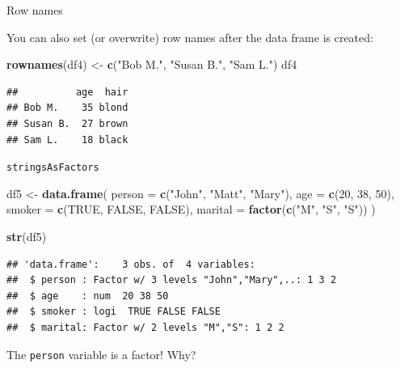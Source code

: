 \documentclass[ignorenonframetext,]{beamer}
\newenvironment{Shaded}{\begin{snugshade}}{\end{snugshade}}
\newcommand{\DataTypeTok}[1]{\textcolor[rgb]{0.13,0.29,0.53}{#1}}
\newcommand{\DecValTok}[1]{\textcolor[rgb]{0.00,0.00,0.81}{#1}}
\newcommand{\KeywordTok}[1]{\textcolor[rgb]{0.13,0.29,0.53}{\textbf{#1}}}
\newcommand{\NormalTok}[1]{#1}
\newcommand{\OtherTok}[1]{\textcolor[rgb]{0.56,0.35,0.01}{#1}}
\newcommand{\StringTok}[1]{\textcolor[rgb]{0.31,0.60,0.02}{#1}}
\begin{document}
\begin{frame}[fragile]{Row names}
\protect\hypertarget{row-names-1}{}

You can also set (or overwrite) row names after the data frame is
created:

\begin{Shaded}
\begin{Highlighting}[]
\KeywordTok{rownames}\NormalTok{(df4) <-}\StringTok{ }\KeywordTok{c}\NormalTok{(}\StringTok{"Bob M."}\NormalTok{, }\StringTok{"Susan B."}\NormalTok{, }\StringTok{"Sam L."}\NormalTok{) }
\NormalTok{df4}
\end{Highlighting}
\end{Shaded}

\begin{verbatim}
##          age  hair
## Bob M.    35 blond
## Susan B.  27 brown
## Sam L.    18 black
\end{verbatim}

\end{frame}

\begin{frame}[fragile]{\texttt{stringsAsFactors}}
\protect\hypertarget{stringsasfactors}{}

\begin{Shaded}
\begin{Highlighting}[]
\NormalTok{df5 <-}\StringTok{ }\KeywordTok{data.frame}\NormalTok{(}
  \DataTypeTok{person =} \KeywordTok{c}\NormalTok{(}\StringTok{"John"}\NormalTok{, }\StringTok{"Matt"}\NormalTok{, }\StringTok{"Mary"}\NormalTok{),}
  \DataTypeTok{age =} \KeywordTok{c}\NormalTok{(}\DecValTok{20}\NormalTok{, }\DecValTok{38}\NormalTok{, }\DecValTok{50}\NormalTok{),}
  \DataTypeTok{smoker =} \KeywordTok{c}\NormalTok{(}\OtherTok{TRUE}\NormalTok{, }\OtherTok{FALSE}\NormalTok{, }\OtherTok{FALSE}\NormalTok{),}
  \DataTypeTok{marital =} \KeywordTok{factor}\NormalTok{(}\KeywordTok{c}\NormalTok{(}\StringTok{"M"}\NormalTok{, }\StringTok{"S"}\NormalTok{, }\StringTok{"S"}\NormalTok{))}
\NormalTok{)}

\KeywordTok{str}\NormalTok{(df5)}
\end{Highlighting}
\end{Shaded}

\begin{verbatim}
## 'data.frame':    3 obs. of  4 variables:
##  $ person : Factor w/ 3 levels "John","Mary",..: 1 3 2
##  $ age    : num  20 38 50
##  $ smoker : logi  TRUE FALSE FALSE
##  $ marital: Factor w/ 2 levels "M","S": 1 2 2
\end{verbatim}

The \texttt{person} variable is a factor! Why?

\end{frame}
\end{document}
